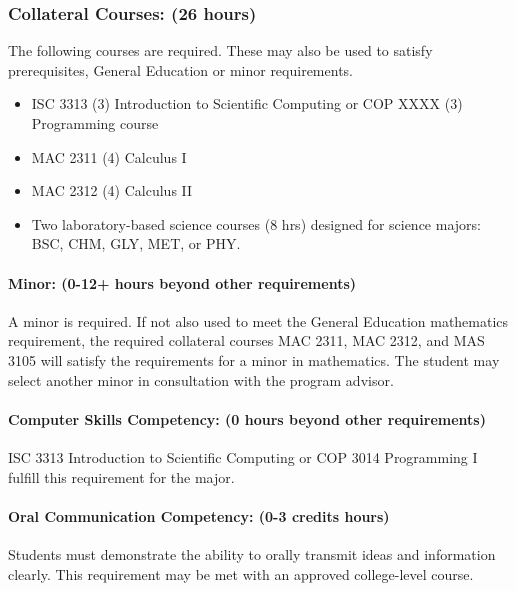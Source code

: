 \documentclass[12pt,a4paper]{article}
\begin{document}
\subsubsection*{Collateral Courses: (26 hours)}
The following courses are required. These may also be used to satisfy prerequisites, General Education or minor requirements.
\begin{itemize}
    \item ISC 3313 (3) Introduction to Scientific Computing or COP XXXX (3) Programming course
    \item MAC 2311 (4) Calculus I
    \item MAC 2312 (4) Calculus II
    \item Two laboratory-based science courses (8 hrs) designed for science majors: BSC, CHM, GLY, MET, or PHY.
\end{itemize}

\paragraph{Minor: (0-12+ hours beyond other requirements)} A minor is required. If not also used to meet the General Education mathematics requirement, the required collateral courses MAC 2311, MAC 2312, and MAS 3105 will satisfy the requirements for a minor in mathematics. The student may select another minor in consultation with the program advisor.

\paragraph{Computer Skills Competency: (0 hours beyond other requirements)} ISC 3313 Introduction to Scientific Computing or COP 3014 Programming I fulfill this requirement for the major.

\paragraph{Oral Communication Competency: (0-3 credits hours)} Students must demonstrate the ability to orally transmit ideas and information clearly. This requirement may be met with an approved college-level course.
\end{document}
